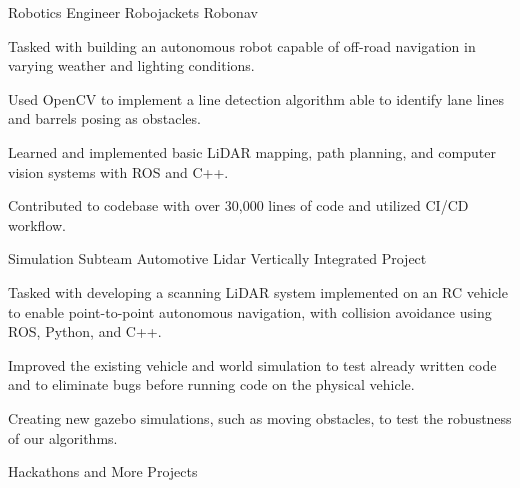 \begin{cventries}
    \cventry
        {Robotics Engineer}
        {Robojackets Robonav}
        {}
        {}
        {
          \begin{cvitems}
            \item {Tasked with building an autonomous robot capable of off-road navigation in varying weather and lighting conditions.}
                    \vspace{1mm}
            \item {Used OpenCV to implement a line detection algorithm able to identify lane lines and barrels posing as obstacles.}
                    \vspace{1mm}
            \item {Learned and implemented basic LiDAR mapping, path planning, and computer vision systems with ROS and C++.}
                    \vspace{1mm}
            \item {Contributed to codebase with over 30,000 lines of code and utilized CI/CD workflow.}
                    \vspace{1mm}
          \end{cvitems}
        }
        \vspace{-1mm}
    \cventry
        {Simulation Subteam}
        {Automotive Lidar Vertically Integrated Project}
        {}
        {}
        {
          \begin{cvitems}
            \item {Tasked with developing a scanning LiDAR system implemented on an RC vehicle to enable point-to-point autonomous navigation, with collision avoidance using ROS, Python, and C++.}
                \vspace{1mm}
            \item {Improved the existing vehicle and world simulation to test already written code and to eliminate bugs before running code on the physical vehicle.}
                \vspace{1mm}
            \item {Creating new gazebo simulations, such as moving obstacles, to test the robustness of our algorithms.}
                \vspace{1mm}
          \end{cvitems}
        }
        \vspace{-1mm}
  \cventry
    {Hackathons and More}
    {Projects}
    {}
    {}
    {
      \begin{cvitems}

\end{cvitems}}
\end{cventries}

